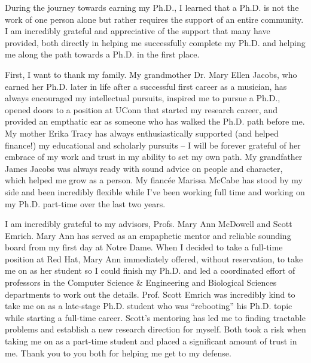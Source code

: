 \begin{acknowledge}

  During the journey towards earning my Ph.D., I learned that a Ph.D. is not the work of one person alone but rather requires the support of an entire community. I am incredibly grateful and appreciative of the support that many have provided, both directly in helping me successfully complete my Ph.D. and helping me along the path towards a Ph.D. in the first place.

  First, I want to thank my family.  My grandmother Dr. Mary Ellen Jacobs, who earned her Ph.D. later in life after a successful first career as a musician, has always encouraged my intellectual pursuits, inspired me to pursue a Ph.D., opened doors to a position at UConn that started my research career, and provided an empthatic ear as someone who has walked the Ph.D. path before me.  My mother Erika Tracy has always enthusiastically supported (and helped finance!) my educational and scholarly pursuits -- I will be forever grateful of her embrace of my work and trust in my ability to set my own path. My grandfather James Jacobs was always ready with sound advice on people and character, which helped me grow as a person.  My fianc\'{e}e Marissa McCabe has stood by my side and been incredibly flexible while I've been working full time and working on my Ph.D. part-time over the last two years.

  I am incredibly grateful to my advisors, Profs. Mary Ann McDowell and Scott Emrich. Mary Ann  has served as an empaphetic mentor and reliable sounding board from my first day at Notre Dame.  When I decided to take a full-time position at Red Hat, Mary Ann immediately offered, without reservation, to take me on as her student so I could finish my Ph.D. and led a coordinated effort of professors in the Computer Science \& Engineering and Biological Sciences departments to work out the details.   Prof. Scott Emrich was incredibly kind to take me on as a late-stage Ph.D. student who was ``rebooting'' his Ph.D. topic while starting a full-time career.  Scott's mentoring has led me to finding tractable problems and establish a new research direction for myself.  Both took a risk when taking me on as a part-time student and placed a significant amount of trust in me.  Thank you to you both for helping me get to my defense.


\end{acknowledge}
